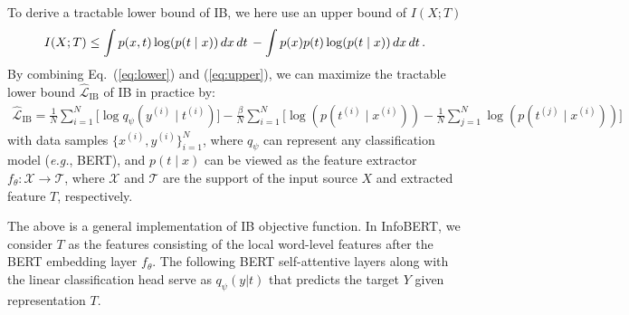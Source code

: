 \documentclass{article} \usepackage{iclr2021_conference,times}
\theoremstyle{definition}
\theoremstyle{remark}
\newcommand{\method}{InfoBERT\xspace}
\newcommand{\modified}[1]{{\color{black}{#1}}}
\begin{document}
To derive a tractable lower bound of IB, we here use an upper bound \citep{Cheng2020CLUBAC} of $I(X;T)$ 
\begin{align}
\label{eq:upper}
    I(X; T) \le  \int  p(x, t) \log (p(t \mid x)) \,  \modified{dx \, dt \,} -  \int  p(x) p(t) \log (p(t \mid x)) \, \modified{dx \, dt \,}.
\end{align}
By combining Eq.~(\ref{eq:lower}) and (\ref{eq:upper}), we can maximize the tractable lower bound ${\mathcal{\hat{L}}}_{\text{IB}}$ of IB in practice by:
\begin{align}
\label{eq:all}
    \hat{\mathcal{L}}_{\text{IB}} = \frac{1}{N}\sum_{i=1}^{N} \big[ \log q_\psi({y}^{(i)} \mid {t}^{(i)}) \big] -  \frac{\beta}{N} \sum_{i=1}^{N} \Big[\log (p({t}^{(i)} \mid {x}^{(i)})) -  \frac{1}{N} \sum_{j=1}^{N} \log (p({t}^{(j)} \mid {x}^{(i)}))  \Big]
\end{align}
with data samples $\{{x}^{(i)}, {y}^{(i)}\}_{i=1}^{N}$, where   $q_\psi$ can represent any classification model (\emph{e.g.}, BERT), and   $p(t \mid x)$ can be viewed as the feature extractor $f_\theta: \mathcal{X} \rightarrow \mathcal{T}$, where $\mathcal{X}$ and $\mathcal{T}$ are the support of the input source $X$ and extracted feature $T$, respectively.

The above is a general implementation of IB objective function. In \method, we consider $T$ as the features consisting of the local word-level features after the BERT embedding layer $f_\theta$. The following BERT self-attentive layers along with the linear classification head serve as  $q_\psi(y|t)$ that predicts the target $Y$ given representation $T$. 
\end{document}
